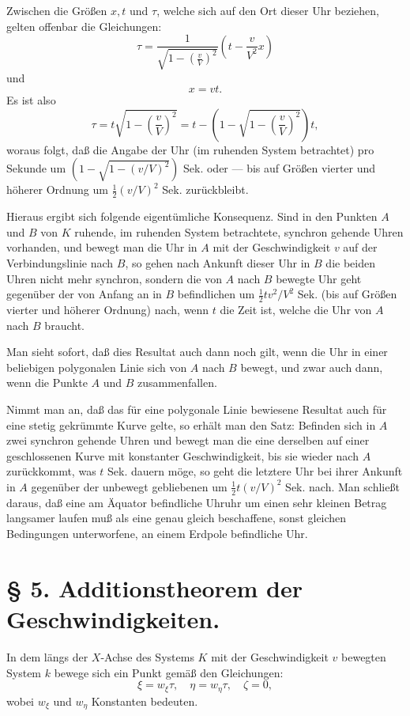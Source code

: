 \documentclass[17pt]{webarticle}       %
\begin{document}
Zwischen die Größen \( x, t \) und \( \tau \), welche sich auf den Ort dieser Uhr beziehen, gelten offenbar die Gleichungen:
\[
\tau = \frac{1}{\sqrt{1 - \left( \frac{v}{V} \right)^2}} \left( t - \frac{v}{V^2} x \right)
\]
und
\[
x = vt.
\]
Es ist also
\[
\tau = t \sqrt{1 - \left( \frac{v}{V} \right)^2} = t - \left( 1 - \sqrt{1 - \left( \frac{v}{V} \right)^2} \right) t,
\]
woraus folgt, daß die Angabe der Uhr (im ruhenden System betrachtet) pro Sekunde um \( (1 - \sqrt{1 - (v/V)^2}) \) Sek. oder — bis auf Größen vierter und höherer Ordnung um \(\frac{1}{2} (v/V)^2 \) Sek. zurückbleibt.

Hieraus ergibt sich folgende eigentümliche Konsequenz. Sind in den Punkten \( A \) und \( B \) von \( K \) ruhende, im ruhenden System betrachtete, synchron gehende Uhren vorhanden, und bewegt man die Uhr in \( A \) mit der Geschwindigkeit \( v \) auf der Verbindungslinie nach \( B \), so gehen nach Ankunft dieser Uhr in \( B \) die beiden Uhren nicht mehr synchron, sondern die von \( A \) nach \( B \) bewegte Uhr geht gegenüber der von Anfang an in \( B \) befindlichen um \(\frac{1}{2} t v^2/V^2 \) Sek. (bis auf Größen vierter und höherer Ordnung) nach, wenn \( t \) die Zeit ist, welche die Uhr von \( A \) nach \( B \) braucht.

Man sieht sofort, daß dies Resultat auch dann noch gilt, wenn die Uhr in einer beliebigen polygonalen Linie sich von \( A \) nach \( B \) bewegt, und zwar auch dann, wenn die Punkte \( A \) und \( B \) zusammenfallen.

Nimmt man an, daß das für eine polygonale Linie bewiesene Resultat auch für eine stetig gekrümmte Kurve gelte, so erhält man den Satz: Befinden sich in \( A \) zwei synchron gehende Uhren und bewegt man die eine derselben auf einer geschlossenen Kurve mit konstanter Geschwindigkeit, bis sie wieder nach \( A \) zurückkommt, was \( t \) Sek. dauern möge, so geht die letztere Uhr bei ihrer Ankunft in \( A \) gegenüber der unbewegt gebliebenen um \(\frac{1}{2} t (v/V)^2\) Sek. nach. Man schließt daraus, daß eine am Äquator befindliche Uhruhr um einen sehr kleinen Betrag langsamer laufen muß als eine genau gleich beschaffene, sonst gleichen Bedingungen unterworfene, an einem Erdpole befindliche Uhr.

\section*{§ 5. Additionstheorem der Geschwindigkeiten.}

In dem längs der \( X \)-Achse des Systems \( K \) mit der Geschwindigkeit \( v \) bewegten System \( k \) bewege sich ein Punkt gemäß den Gleichungen:
\[
\xi = w_\xi \tau, \quad \eta = w_\eta \tau, \quad \zeta = 0,
\]
wobei \( w_\xi \) und \( w_\eta \) Konstanten bedeuten.
\end{document}
